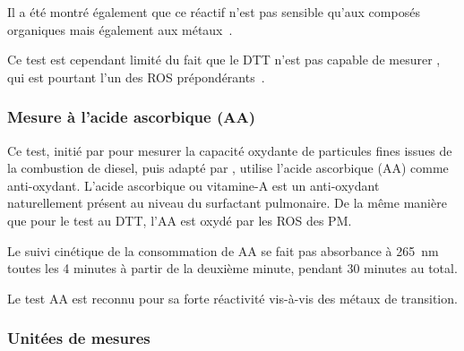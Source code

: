 Il a été montré également que ce réactif n'est pas sensible qu'aux composés organiques
mais également aux métaux~\autocite{charrierDithiothreitol2012,linGeneration2011}.

Ce test est cependant limité du fait que le DTT n'est pas capable de mesurer
, qui est pourtant l'un des ROS prépondérants~\autocite{xiongRethinking2017}.

\subsubsection{Mesure à l'acide ascorbique (AA)}%
\label{ssub:mesure_à_l_aa}

Ce test, initié par \textcite{zielinskiModeling1999} pour mesurer la capacité oxydante de
particules fines issues de la combustion de diesel, puis adapté par
\textcite{mudwayVitro2004,ayresEvaluating2008}, utilise l'acide ascorbique (AA) comme
anti-oxydant.
L'acide ascorbique ou vitamine-A est un anti-oxydant naturellement présent au niveau du
surfactant pulmonaire. De la même manière que pour le test au DTT, l'AA est oxydé par
les ROS des PM.

Le suivi cinétique de la consommation de AA se fait pas absorbance à \SI{265}{\nano\m}
toutes les 4 minutes à partir de la deuxième minute, pendant 30 minutes au total.

Le test AA est reconnu pour sa forte réactivité vis-à-vis des métaux de transition. 


%
%
%

\subsubsection{Unitées de mesures}%
\label{ssub:unitees_de_mesures}

